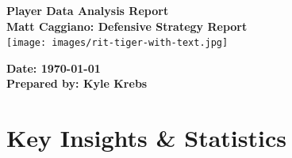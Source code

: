 \documentclass[a4paper,12pt]{article}
\begin{document}
\begin{titlepage}
    \centering
    {\Huge \textbf{Player Data Analysis Report}}\\[1.5cm]

    {\Large \textbf{Matt Caggiano: Defensive Strategy Report}}\\[4cm]
    
    \texttt{[image: images/rit-tiger-with-text.jpg]} %
    
    \vfill
    
    \textbf{Date: \today}\\[1cm]
    \textbf{Prepared by: Kyle Krebs}
\end{titlepage}

\section*{Key Insights \& Statistics}

\vspace{1em}
\end{document}
